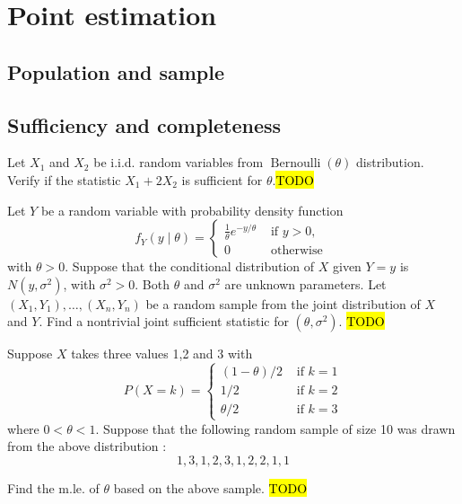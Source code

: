 
\chapter{Point estimation\label{chap:pointEstimation}}

\section{Population and sample}

\section{Sufficiency and completeness}
\begin{example}
\label{exa:isi2007samplepsb9}Let $X_{1}$ and $X_{2}$ be i.i.d.
random variables from $\operatorname{Bernoulli}(\theta)$ distribution.
Verify if the statistic $X_{1}+2X_{2}$ is sufficient for $\theta$.\hl{TODO}
\end{example}

\begin{example}
\label{exa:isi2006samplepsb7}Let $Y$ be a random variable with probability
density function 
\[
f_{Y}(y\mid\theta)=\begin{cases}
\frac{1}{\theta}e^{-y/\theta} & \text{ if }y>0,\\
0 & \text{ otherwise }
\end{cases}
\]
 with $\theta>0$. Suppose that the conditional distribution of $X$
given $Y=y$ is $N\left(y,\sigma^{2}\right)$, with $\sigma^{2}>0$.
Both $\theta$ and $\sigma^{2}$ are unknown parameters. Let $\left(X_{1},Y_{1}\right),\ldots,\left(X_{n},Y_{n}\right)$
be a random sample from the joint distribution of $X$ and $Y$. Find
a nontrivial joint sufficient statistic for $\left(\theta,\sigma^{2}\right)$.
\hl{TODO}
\end{example}

\begin{example}
\label{exa:isi2007samplepsb10}Suppose $X$ takes three values 1,2
and 3 with 
\[
P(X=k)=\begin{cases}
(1-\theta)/2 & \text{ if }k=1\\
1/2 & \text{ if }k=2\\
\theta/2 & \text{ if }k=3
\end{cases}
\]
 where $0<\theta<1$. Suppose that the following random sample of
size 10 was drawn from the above distribution : 
\[
1,3,1,2,3,1,2,2,1,1
\]

Find the m.le. of $\theta$ based on the above sample. \hl{TODO}
\end{example}


